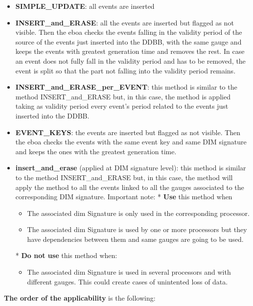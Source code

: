 \begin{itemize}
\item \textbf{SIMPLE\_UPDATE}: all events are inserted
\item \textbf{INSERT\_and\_ERASE}: all the events are inserted but flagged as not visible. Then the \acrshort{eboa} checks the events falling in the validity period of the source of the events just inserted into the DDBB, with the same gauge and keeps the events with greatest generation time and removes the rest. In case an event does not fully fall in the validity period and has to be removed, the event is split so that the part not falling into the validity period remains.
\item \textbf{INSERT\_and\_ERASE\_per\_EVENT}: this method is similar to the method INSERT\_and\_ERASE but, in this case, the method is applied taking as validity period every event's period related to the events just inserted into the DDBB.
\item \textbf{EVENT\_KEYS}: the events are inserted but flagged as not visible. Then the \acrshort{eboa} checks the events with the same event key and same DIM signature and keeps the ones with the greatest generation time.
\item \textbf{insert\_and\_erase} (applied at DIM signature level): this method is similar to the method INSERT\_and\_ERASE but, in this case, the method will apply the method to all the events linked to all the gauges associated to the corresponding DIM signature.
  Important note: \newline  
  * \textbf{Use} this method when
  \begin{itemize}
  \item The associated \acrshort{dim} Signature is only used in the corresponding processor.
  \item The associated \acrshort{dim} Signature is used by one or more processors but they have dependencies between them and same gauges are going to be used.
  \end{itemize}

  * \textbf{Do not use} this method when:
  \begin{itemize}
  \item The associated \acrshort{dim} Signature is used in several processors and with different gauges. This could create cases of unintented loss of data.
  \end{itemize}
\end{itemize}

\textbf{The order of the applicability} is the following:

